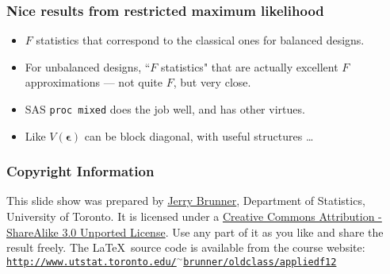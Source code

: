 \documentclass[serif]{beamer} %
\begin{document}
\begin{frame}
\frametitle{Nice results from restricted maximum likelihood}
  \begin{itemize}
    \item $F$ statistics that correspond to the classical ones for balanced designs.
    \item For unbalanced designs, ``$F$ statistics" that are actually excellent $F$ approximations --- not quite $F$, but very close.
    \item SAS \texttt{proc mixed} does the job well, and has other virtues.
    \item Like $V(\boldsymbol{\epsilon})$ can be block diagonal, with useful structures \ldots
  \end{itemize}
\end{frame}





\begin{frame}
\frametitle{Copyright Information}

This slide show was prepared by  \href{http://www.utstat.toronto.edu/~brunner}{Jerry Brunner},
Department of Statistics, University of Toronto. It is licensed under a 
\href{http://creativecommons.org/licenses/by-sa/3.0/deed.en_US}
     {Creative Commons Attribution - ShareAlike 3.0 Unported License}. Use any part of it as you like and share the result freely. The \LaTeX~source code is available from the course website:
\href{http://www.utstat.toronto.edu/~brunner/oldclass/appliedf12} {\small\texttt{http://www.utstat.toronto.edu/$^\sim$brunner/oldclass/appliedf12}}





\end{frame}
\end{document}
